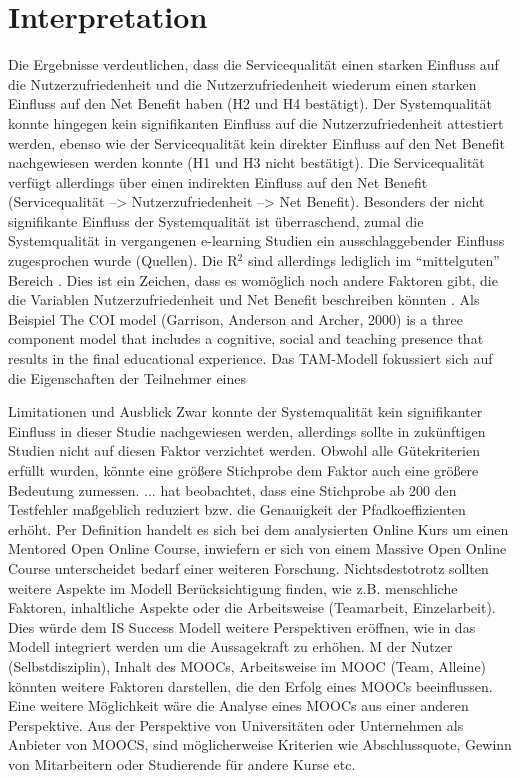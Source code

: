 \section{Interpretation}
\label{sec:vergleich}
Die Ergebnisse verdeutlichen, dass die Servicequalität einen starken Einfluss auf die Nutzerzufriedenheit und die Nutzerzufriedenheit wiederum einen starken Einfluss auf den Net Benefit haben (H2 und H4 bestätigt). Der Systemqualität konnte hingegen kein signifikanten Einfluss auf die Nutzerzufriedenheit attestiert werden, ebenso wie der Servicequalität kein direkter Einfluss auf den Net Benefit nachgewiesen werden konnte (H1 und H3 nicht bestätigt). Die Servicequalität verfügt allerdings über einen indirekten Einfluss auf den Net Benefit (Servicequalität --> Nutzerzufriedenheit --> Net Benefit). Besonders der nicht signifikante Einfluss der Systemqualität ist überraschend, zumal die Systemqualität in vergangenen e-learning Studien ein ausschlaggebender Einfluss zugesprochen wurde (Quellen).
Die R$^2$ sind allerdings lediglich im "`mittelguten"' Bereich \parencite[vgl.][S.323]{chin1998partial}. Dies ist ein Zeichen, dass es womöglich noch andere Faktoren gibt, die die Variablen Nutzerzufriedenheit und Net Benefit beschreiben könnten \parencite[vgl.][S.179]{freeze2010success}.  
Als Beispiel 
The COI model (Garrison, Anderson and Archer, 2000) is a three component model that includes a cognitive, social and teaching presence that results in the final educational experience.
Das TAM-Modell fokussiert sich auf die Eigenschaften der Teilnehmer  eines 

Limitationen und Ausblick
Zwar konnte der Systemqualität kein signifikanter Einfluss in dieser Studie nachgewiesen werden, allerdings sollte in zukünftigen Studien nicht auf diesen Faktor verzichtet werden. Obwohl alle Gütekriterien erfüllt wurden, könnte eine größere Stichprobe dem Faktor auch eine größere Bedeutung zumessen. ... hat beobachtet, dass eine Stichprobe ab 200 den Testfehler maßgeblich reduziert bzw. die Genauigkeit der Pfadkoeffizienten erhöht.
Per Definition handelt es sich bei dem analysierten Online Kurs um einen Mentored Open Online Course, inwiefern er sich von einem Massive Open Online Course unterscheidet bedarf einer weiteren Forschung. 
Nichtsdestotrotz sollten weitere Aspekte im Modell Berücksichtigung finden, wie z.B. menschliche Faktoren, inhaltliche Aspekte oder die Arbeitsweise (Teamarbeit, Einzelarbeit). Dies würde dem IS Success Modell weitere Perspektiven eröffnen, wie  in das Modell integriert werden um die Aussagekraft zu erhöhen. M der Nutzer (Selbstdisziplin), Inhalt des MOOCs, Arbeitsweise im MOOC (Team, Alleine) könnten weitere Faktoren darstellen, die den Erfolg eines MOOCs beeinflussen. 
Eine weitere Möglichkeit wäre die Analyse eines MOOCs aus einer anderen Perspektive. Aus der Perspektive von Universitäten oder Unternehmen als Anbieter von MOOCS, sind möglicherweise Kriterien wie Abschlussquote, Gewinn von Mitarbeitern oder Studierende für andere Kurse etc. 



